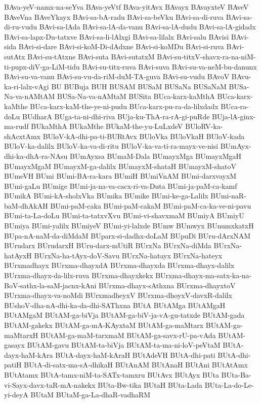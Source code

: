 {BAva-yeV-namx-na-seYva
BAva-yeVtf
BAva-yitAvx
BAvayx
BAvayxteV
BAveV
BAveVna
BAveYkayx
BAvi-sa-bA-radu
BAvi-sa-beVku
BAvi-sa-di-ruva
BAvi-sa-di-ru-vudu
BAvi-sa-lAda
BAvi-sa-lA-da-vanu
BAvi-sa-lA-dudu
BAvi-sa-lA-gidadx
BAvi-sa-lapx-Du-tatxve
BAvi-sa-li-lAlxgi
BAvi-sa-lilalx
BAvi-salu
BAvisi
BAvi-sida
BAvi-si-dare
BAvi-si-koM-Di-dAdxne
BAvi-si-koMDu
BAvi-si-ruva
BAvi-sutAtx
BAvi-su-tAtxne
BAvi-suta
BAvi-sutatxM
BAvi-su-titxV-shavx-ra-na-niM-ti-pupx-diV-ga-LiM-tidu
BAvi-su-titx-ruva
BAvi-suva
BAvi-su-va-neM-bu-danunx
BAvi-su-va-vanu
BAvi-su-vu-da-riM-duM-TA-guva
BAvi-su-vudu
BAvoV
BAvu-ka-ri-lalx-vAgi
BU
BUBuja
BUH
BUSAM
BUSaM
BUSaNa
BUSaNaM
BUSa-Na-va-nAMtAM
BUSa-Na-va-nAMtaM
BUSita
BUca-karx-kaMthA
BUca-karx-kaMthe
BUca-karx-kaM-the-ye-ni-pudu
BUca-karx-pu-ra-da-lilxdadx
BUca-ra-doLu
BUdharA
BUga-ta-ni-dhi-riva
BUja-ku-ThA-ra-rA-gi-puRde
BUja-lA-ginx-ma-rudf
BUkaMthA
BUkaMthe
BUkaM-the-yu-LuLxdeV
BUloRV-ka-shAcxtAmx
BUloV-kA-dhi-pa-ti-BURtAvx
BUloVka
BUloVkaH
BUloV-kada
BUloV-ka-dalilx
BUloV-ka-va-di-ritu
BUloV-ka-va-ti-ra-mayx-ve-nisi
BUmAyx-dhi-ka-dhA-ra-NAsu
BUmAyxsa
BUmaM-Dala
BUmayxMga
BUmayxMgaH
BUmayxMgaM
BUmayxM-ga-dalilx
BUmayxM-shataH
BUmayxM-shatoV
BUmeVH
BUmi
BUmi-BA-ra-kara
BUmiH
BUmiVnAM
BUmi-darxvayxM
BUmi-gaLu
BUmige
BUmi-ja-na-va-cacx-ri-va-Duta
BUmi-ja-paM-ca-kamf
BUmikA
BUmi-kA-sholxVka
BUmika
BUmike
BUmi-ke-ga-Lalilx
BUmi-naR-baM-dhAkAH
BUmi-paM-caka
BUmi-paM-cakaM
BUmi-paM-ca-ka-ve-ni-pavu
BUmi-ta-La-doLu
BUmi-ta-tatxvXvu
BUmi-vi-shavxmaM
BUmiyA
BUmiyU
BUmiya
BUmi-yalilx
BUmiyeV
BUmi-yi-lalxde
BUmw
BUmwyx
BUnumxkatxH
BUpa-nA-naM-da-diMdaM
BUparx-si-dadhx-doLaM
BUpuDi
BUru-dArxNAM
BUrudarx
BUrudarxH
BUru-darx-mUtiR
BUrxNa
BUrxNa-diMda
BUrxNa-hatAyxH
BUrxNa-ha-tAyx-doV-Savu
BUrxNa-hatayx
BUrxNa-hateyx
BUrxmadhayx
BUrxma-dhayxdA
BUrxma-dhayxda
BUrxma-dhayx-dalilx
BUrxma-dhayx-da-lilx-ruva
BUrxma-dhayxkekx
BUrxma-dhayx-ma-satx-ka-na-BoV-sathx-la-saM-jacnx-kAni
BUrxma-dhayx-sAthxna
BUrxma-dhayxtoV
BUrxma-dhayx-va-noMdi
BUrxmadheyxV
BUrxma-dhoyxV-davxR-dalilx
BUshoV-dha-nA-dhi-ka-da-dhi-SAThxna
BUtA
BUtAMga
BUtAMgaH
BUtAMgaM
BUtAM-ga-biVja
BUtAM-ga-biV-ja-vA-gu-tatxde
BUtAM-gada
BUtAM-gakekx
BUtAM-ga-mA-KAyxtaM
BUtAM-ga-maMtarx
BUtAM-ga-maMtarxH
BUtAM-ga-maM-tarxmaM
BUtAM-ga-savx-rU-pa-vAda
BUtAM-gasayx
BUtAM-gavu
BUtAM-ta-biVja
BUtAM-ta-ma-ni-loV-peVtaM
BUtA-dayx-haM-kAra
BUtA-dayx-haM-kAraH
BUtAdeVH
BUtA-dhi-pati
BUtA-dhi-patiH
BUtA-di-satx-ma-sA-dhikaH
BUtAnAM
BUtAnaH
BUtAni
BUtAtAmx
BUtAtamx
BUtA-tamx-niM-ta-SATx-tamxru
BUtAvx
BUtAyx
BUta
BUta-Ba-vi-Sayx-davx-taR-mA-nakekx
BUta-Bw-tika
BUtaH
BUta-Lada
BUta-La-do-Le-yi-deyA
BUtaM
BUtaM-ga-La-dhaR-vadhaRM
}
